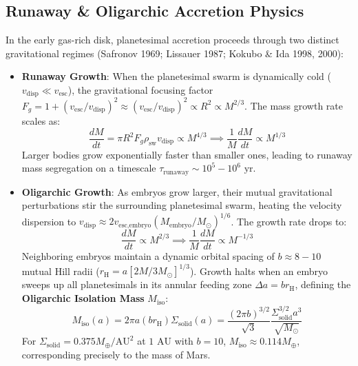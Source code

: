 \documentclass[11pt,a4paper]{article}
\begin{document}
\subsection{Runaway \& Oligarchic Accretion Physics}
In the early gas-rich disk, planetesimal accretion proceeds through two distinct gravitational regimes (Safronov 1969; Lissauer 1987; Kokubo \& Ida 1998, 2000):
\begin{itemize}
    \item \textbf{Runaway Growth}: When the planetesimal swarm is dynamically cold ($v_{\text{disp}} \ll v_{\text{esc}}$), the gravitational focusing factor $F_g = 1 + (v_{\text{esc}} / v_{\text{disp}})^2 \approx (v_{\text{esc}} / v_{\text{disp}})^2 \propto R^2 \propto M^{2/3}$. The mass growth rate scales as:
    \begin{equation}
    \frac{dM}{dt} = \pi R^2 F_g \rho_{\text{sw}} v_{\text{disp}} \propto M^{4/3} \implies \frac{1}{M}\frac{dM}{dt} \propto M^{1/3}
    \end{equation}
    Larger bodies grow exponentially faster than smaller ones, leading to runaway mass segregation on a timescale $\tau_{\text{runaway}} \sim 10^5-10^6\text{ yr}$.
    
    \item \textbf{Oligarchic Growth}: As embryos grow larger, their mutual gravitational perturbations stir the surrounding planetesimal swarm, heating the velocity dispersion to $v_{\text{disp}} \approx 2 v_{\text{esc,embryo}} (M_{\text{embryo}} / M_\odot)^{1/6}$. The growth rate drops to:
    \begin{equation}
    \frac{dM}{dt} \propto M^{2/3} \implies \frac{1}{M}\frac{dM}{dt} \propto M^{-1/3}
    \end{equation}
    Neighboring embryos maintain a dynamic orbital spacing of $b \approx 8-10$ mutual Hill radii ($r_{\text{H}} = a [2 M / 3 M_\odot]^{1/3}$). Growth halts when an embryo sweeps up all planetesimals in its annular feeding zone $\Delta a = b r_{\text{H}}$, defining the \textbf{Oligarchic Isolation Mass} $M_{\text{iso}}$:
    \begin{equation}
    M_{\text{iso}}(a) = 2 \pi a (b r_{\text{H}}) \Sigma_{\text{solid}}(a) = \frac{(2 \pi b)^{3/2}}{\sqrt{3}} \frac{\Sigma_{\text{solid}}^{3/2} a^3}{\sqrt{M_\odot}}
    \end{equation}
    For $\Sigma_{\text{solid}} = 0.375 M_\oplus/\text{AU}^2$ at $1\text{ AU}$ with $b = 10$, $M_{\text{iso}} \approx 0.114 M_\oplus$, corresponding precisely to the mass of Mars.
\end{itemize}
\end{document}
